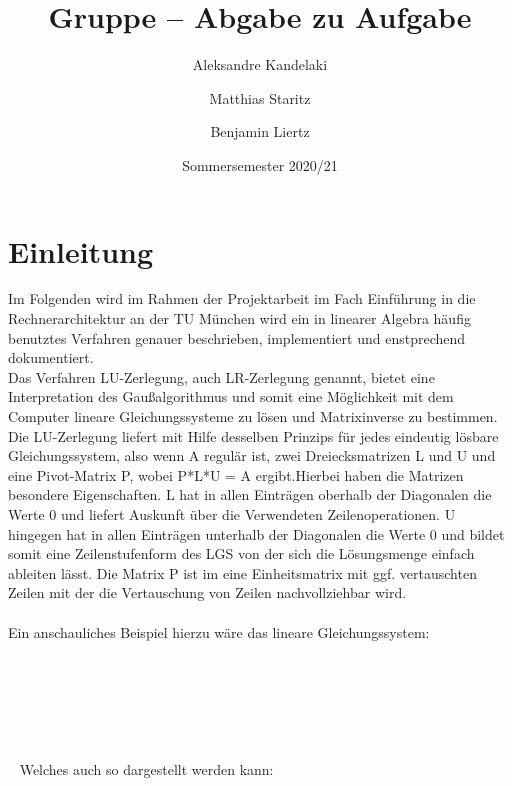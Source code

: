 \documentclass[course=erap]{aspdoc}
\author{⁨Aleksandre Kandelaki \and Matthias Staritz \and Benjamin Liertz}
\date{Sommersemester 2020/21} %
\title{Gruppe \theGroup{} -- Abgabe zu Aufgabe \theNumber}
\begin{document}
\maketitle

\section{Einleitung}

\noindent\hspace*{15mm}%
Im Folgenden wird im Rahmen der Projektarbeit im Fach Einführung
in die Rechnerarchitektur an der TU München wird ein in linearer Algebra häufig 
benutztes Verfahren genauer beschrieben, implementiert und enstprechend dokumentiert.\\

\noindent\hspace*{15mm}%
Das Verfahren LU-Zerlegung, auch LR-Zerlegung genannt, bietet eine Interpretation des Gaußalgorithmus 
	 und somit eine Möglichkeit mit dem Computer lineare Gleichungssysteme zu 
	 lösen und Matrixinverse zu bestimmen.\\
 
\noindent\hspace*{15mm}%
Die LU-Zerlegung liefert mit Hilfe desselben Prinzips für jedes
   eindeutig lösbare Gleichungssystem, also wenn A regulär ist, zwei Dreiecksmatrizen L und 
   U und eine Pivot-Matrix P, wobei P*L*U = A ergibt.Hierbei haben die Matrizen besondere 
   Eigenschaften. L hat in allen Einträgen oberhalb der Diagonalen die Werte 0 und liefert 
   Auskunft über die Verwendeten Zeilenoperationen. U hingegen hat in allen Einträgen unterhalb
    der Diagonalen die Werte 0 und bildet somit eine Zeilenstufenform des LGS von der sich die 
    Lösungsmenge einfach ableiten lässt. Die Matrix P ist im eine Einheitsmatrix mit ggf. 
    vertauschten Zeilen mit der die Vertauschung von Zeilen nachvollziehbar wird.\\\\
    

\noindent\hspace*{15mm}%
Ein anschauliches Beispiel hierzu wäre das lineare Gleichungssystem:
\\\\\\\\\\\\\\\
\noindent\hspace*{15mm}%
Welches auch so dargestellt werden kann:  
\\\\\\\\\\\\\\\
\end{document}
